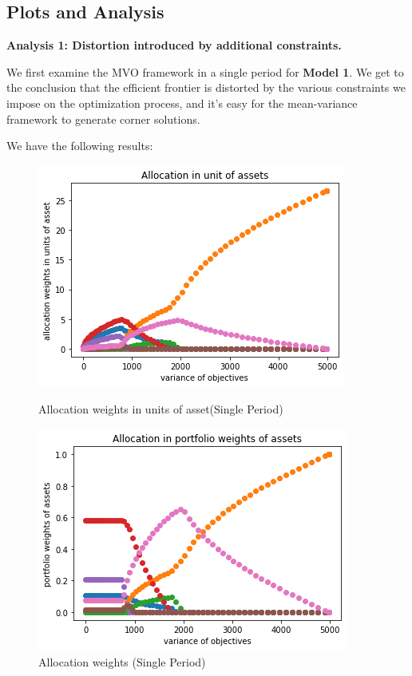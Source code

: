 \documentclass[13pt]{article}
\theoremstyle{definition}
\theoremstyle{remark}
\begin{document}
\subsection{Plots and Analysis}
{\color{C6}\textbf{Analysis 1: Distortion introduced by additional constraints.}} 

We first examine the MVO framework in a single period for \textbf{Model 1}. We get to the conclusion that the efficient frontier is distorted by the various constraints we impose on the optimization process, and it's easy for the mean-variance framework to generate corner solutions.

We have the following results:

\begin{figure}[!htbp]
\begin{minipage}{0.5\textwidth}
        \centering
        \includegraphics[width=0.9\linewidth,height =0.7\linewidth, angle=0]{single perid allocation units.png}
        \caption{Allocation weights in units of asset(Single Period)}
         \label{fig:single perid allocation units}
\end{minipage}\hfill
\begin{minipage}{0.5\textwidth}
        \centering
        \includegraphics[width=0.9\linewidth,height =0.7\linewidth, angle=0]{single perid allocation weights.png}
        \caption{Allocation weights (Single Period)}
         \label{fig:single perid allocation weights}\end{minipage}
         \end{figure}
\end{document}
